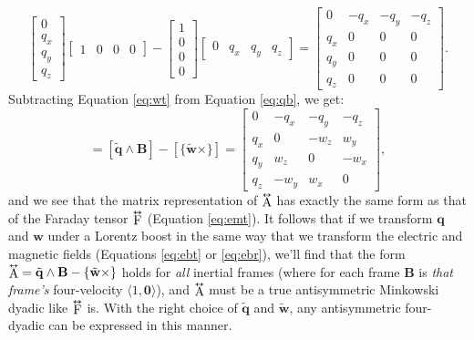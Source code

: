 \documentclass[12pt]{article}
\renewcommand{\vv}[1]{\mathbf{#1}}
\newcommand{\tightoverset}[2]{%
  \mathop{#2}\limits^{\vbox to -.5ex{\kern-0.75ex\hbox{$#1$}\vss}}}
\newcommand{\inlinedy}[1]{\tightoverset{\text{\tiny$\bm\leftrightarrow$}}{#1}}
\newcommand{\capdy}[1]{ \overset{ \text{\tiny$\bm\leftrightarrow$} }{\vphantom{\text{\small{A}}}\smash{#1}} }
\begin{document}
\begin{equation}\label{eq:qb}
\begin{bmatrix}
0 \\
q_x \\
q_y \\
q_z
\end{bmatrix}
\begin{bmatrix}
1 & 0 & 0 & 0
\end{bmatrix}
-
\begin{bmatrix}
1 \\
0 \\
0 \\
0
\end{bmatrix}
\begin{bmatrix}
0 & q_x & q_y & q_z
\end{bmatrix}
=
\begin{bmatrix}
0 & -q_x & -q_y & -q_z \\
q_x & 0 & 0 & 0 \\
q_y & 0 & 0 & 0 \\
q_z & 0 & 0 & 0
\end{bmatrix}.
\end{equation}
Subtracting Equation \ref{eq:wt} from Equation \ref{eq:qb}, we get:
\begin{equation*}
[\capdy{\mathrm{A}}] = [\tilde{\vv q} \wedge \vv B] - [\{ \tilde{\vv w} \times \}]
=
\begin{bmatrix}
0 & -q_x & -q_y & -q_z \\[.5ex]
q_x & 0 & -w_z & w_y \\[.5ex]
q_y & w_z & 0 & -w_x \\[.5ex]
q_z & -w_y & w_x & 0
\end{bmatrix},
\end{equation*}
and we see that the matrix representation of $\inlinedy{\mathrm{A}}$ has exactly the same form as that of the Faraday tensor $\inlinedy{\mathrm{F}}$ (Equation \ref{eq:emt}). It follows that if we transform $\vv q$ and $\vv w$ under a Lorentz boost in the same way that we transform the electric and magnetic fields (Equations \ref{eq:ebt} or \ref{eq:ebr}), we'll find that the form $\inlinedy{\mathrm{A}} = \tilde{\vv q} \wedge \vv B - \{ \tilde{\vv w} \times \}$ holds for \emph{all} inertial frames (where for each frame $\vv B$ is \emph{that frame's} four-velocity $\langle 1, \vv 0 \rangle$), and $\inlinedy{\mathrm{A}}$ must be a true antisymmetric Minkowski dyadic like $\inlinedy{\mathrm{F}}$ is. With the right choice of $\tilde{\vv q}$ and $\tilde{\vv w}$, any antisymmetric four-dyadic can be expressed in this manner.
\end{document}
